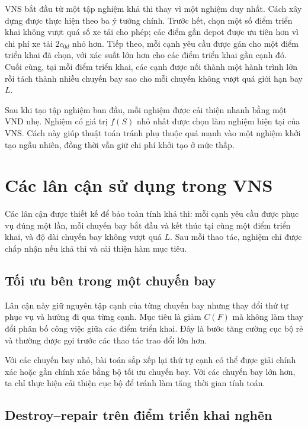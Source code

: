 VNS bắt đầu từ một tập nghiệm khả thi thay vì một nghiệm duy nhất. Cách xây dựng được thực hiện theo ba ý tưởng chính. Trước hết, chọn một số điểm triển khai không vượt quá số xe tải cho phép; các điểm gần depot được ưu tiên hơn vì chi phí xe tải \(2c_{0d}\) nhỏ hơn. Tiếp theo, mỗi cạnh yêu cầu được gán cho một điểm triển khai đã chọn, với xác suất lớn hơn cho các điểm triển khai gần cạnh đó. Cuối cùng, tại mỗi điểm triển khai, các cạnh được nối thành một hành trình lớn rồi tách thành nhiều chuyến bay sao cho mỗi chuyến không vượt quá giới hạn bay \(L\).

Sau khi tạo tập nghiệm ban đầu, mỗi nghiệm được cải thiện nhanh bằng một VND nhẹ. Nghiệm có giá trị \(f(S)\) nhỏ nhất được chọn làm nghiệm hiện tại của VNS. Cách này giúp thuật toán tránh phụ thuộc quá mạnh vào một nghiệm khởi tạo ngẫu nhiên, đồng thời vẫn giữ chi phí khởi tạo ở mức thấp.

\section{Các lân cận sử dụng trong VNS}
\label{sec:vns-neighborhoods}

Các lân cận được thiết kế để bảo toàn tính khả thi: mỗi cạnh yêu cầu được phục vụ đúng một lần, mỗi chuyến bay bắt đầu và kết thúc tại cùng một điểm triển khai, và độ dài chuyến bay không vượt quá \(L\). Sau mỗi thao tác, nghiệm chỉ được chấp nhận nếu khả thi và cải thiện hàm mục tiêu.

\subsection{Tối ưu bên trong một chuyến bay}
\label{subsec:vns-intraroute}

Lân cận này giữ nguyên tập cạnh của từng chuyến bay nhưng thay đổi thứ tự phục vụ và hướng đi qua từng cạnh. Mục tiêu là giảm \(C(F)\) mà không làm thay đổi phân bố công việc giữa các điểm triển khai. Đây là bước tăng cường cục bộ rẻ và thường được gọi trước các thao tác trao đổi lớn hơn.

Với các chuyến bay nhỏ, bài toán sắp xếp lại thứ tự cạnh có thể được giải chính xác hoặc gần chính xác bằng bộ tối ưu chuyến bay. Với các chuyến bay lớn hơn, ta chỉ thực hiện cải thiện cục bộ để tránh làm tăng thời gian tính toán.

\subsection{Destroy--repair trên điểm triển khai nghẽn}
\label{subsec:vns-destroy-repair}

